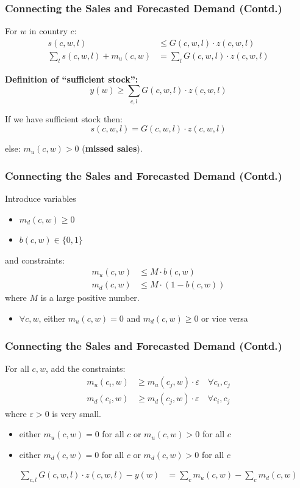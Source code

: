 \documentclass[xcolor=table]{beamer}
\begin{document}
\begin{frame}[t]
  \frametitle{Connecting the Sales and Forecasted Demand (Contd.)}
For $w$ in country $c$:
\begin{align*}
  s(c, w, l) & \leq G(c, w, l) \cdot z(c, w, l) \\
    \sum_{l} s(c, w, l) + m_u(c, w) & = \sum_{l} G(c, w, l) \cdot z(c, w, l)
\end{align*}

\textcolor{orange2}{\textbf{Definition of ``sufficient stock'':}}
\[y(w) \geq \sum_{c, l} G(c, w, l) \cdot z(c, w, l)\]

If we have sufficient stock then: 
  \[s(c, w, l) = G(c, w, l) \cdot z(c, w, l)\]

  else: $m_u(c, w) > 0$ (\textcolor{orange2}{\textbf{missed sales}}).
\end{frame}

\begin{frame}[t]
\frametitle{Connecting the Sales and Forecasted Demand (Contd.)}
Introduce variables 
  \begin{itemize}
    \item $m_d(c, w) \geq 0$
    \item $b(c, w) \in \{0, 1\}$ 
  \end{itemize}      
and constraints:
\begin{align*}
m_u(c, w) & \leq M \cdot b(c, w) \\
m_d(c, w) & \leq M \cdot (1 - b(c, w)) 
\end{align*}
where $M$ is a large positive number.
\begin{itemize}
    \item $\forall c, w$, either $m_u(c, w) = 0$ and $m_d(c, w) \geq 0$ or
      vice versa
\end{itemize}
\end{frame}


\begin{frame}[t]
\frametitle{Connecting the Sales and Forecasted Demand (Contd.)}
For all $c, w$, add the constraints:
\begin{align*}
  m_u(c_i, w) & \geq m_u(c_j, w) \cdot \varepsilon \quad \forall c_i, c_j \\
  m_d(c_i, w) & \geq m_d(c_j, w) \cdot \varepsilon \quad \forall c_i, c_j
\end{align*}
where $\varepsilon > 0$ is very small.
\begin{itemize}
    \item either $m_u(c, w) = 0$ for all $c$ or $m_u(c, w) > 0$ for all $c$
    \item either $m_d(c, w) = 0$ for all $c$ or $m_d(c, w) > 0$ for all $c$
\end{itemize}

\pause

\begin{align*}
 \sum_{c, l} G(c, w, l) \cdot z(c, w, l) - y(w) & = \sum_{c} m_u(c, w) - \sum_{c} m_d(c, w) 
\end{align*}
\end{frame}
\end{document}

